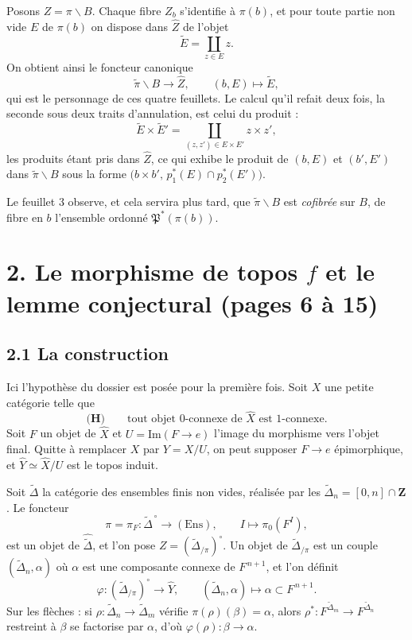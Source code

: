 \documentclass[11pt,a4paper]{article}
\begin{document}
Posons $Z = \pi\backslash B$. Chaque fibre $Z_{b}$ s'identifie à $\pi(b)$, et
pour toute partie non vide $E$ de $\pi(b)$ on dispose dans $\widehat{Z}$ de
l'objet
\[
  \widetilde{E} = \coprod_{z \in E} z .
\]
On obtient ainsi le foncteur canonique
\[
  \widetilde{\pi}\backslash B \longrightarrow \widehat{Z},
  \qquad (b,E) \longmapsto \widetilde{E},
\]
qui est le personnage de ces quatre feuillets. Le calcul qu'il refait deux
fois, la seconde sous deux traits d'annulation, est celui du produit :
\[
  \widetilde{E} \times \widetilde{E}'
  = \coprod_{(z,z') \in E \times E'} z \times z' ,
\]
les produits étant pris dans $\widehat{Z}$, ce qui exhibe le produit de
$(b,E)$ et $(b',E')$ dans $\widetilde{\pi}\backslash B$ sous la forme
$\bigl(b \times b',\, p_{1}^{*}(E) \cap p_{2}^{*}(E')\bigr)$.

Le feuillet 3 observe, et cela servira plus tard, que
$\widetilde{\pi}\backslash B$ est \emph{cofibrée} sur $B$, de fibre en $b$
l'ensemble ordonné $\mathfrak{P}^{*}(\pi(b))$.

\section*{2. Le morphisme de topos $f$ et le lemme conjectural (pages 6 à 15)}

\subsection*{2.1 La construction}

Ici l'hypothèse du dossier est posée pour la première fois. Soit $X$ une
petite catégorie telle que
\[
  \textbf{(H)} \qquad
  \text{tout objet } 0\text{-connexe de } \widehat{X} \text{ est } 1\text{-connexe.}
\]
Soit $F$ un objet de $\widehat{X}$ et $U = \mathrm{Im}(F \to e)$ l'image du
morphisme vers l'objet final. Quitte à remplacer $X$ par $Y = X/U$, on peut
supposer $F \to e$ épimorphique, et $\widehat{Y} \simeq \widehat{X}/U$ est le
topos induit.

Soit $\widetilde{\Delta}$ la catégorie des ensembles finis non vides, réalisée
par les $\widetilde{\Delta}_{n} = [0,n] \cap \mathbf{Z}$. Le foncteur
\[
  \pi = \pi_{F} : \widetilde{\Delta}^{\,\circ} \longrightarrow (\mathrm{Ens}),
  \qquad I \longmapsto \pi_{0}(F^{I}),
\]
est un objet de $\widehat{\widetilde{\Delta}}$, et l'on pose
$Z = (\widetilde{\Delta}_{/\pi})^{\circ}$. Un objet de
$\widetilde{\Delta}_{/\pi}$ est un couple $(\widetilde{\Delta}_{n}, \alpha)$
où $\alpha$ est une composante connexe de $F^{\,n+1}$, et l'on définit
\[
  \varphi : (\widetilde{\Delta}_{/\pi})^{\circ} \longrightarrow \widehat{Y},
  \qquad (\widetilde{\Delta}_{n}, \alpha) \longmapsto \alpha \subset F^{\,n+1}.
\]
Sur les flèches : si $\rho : \widetilde{\Delta}_{n} \to
\widetilde{\Delta}_{m}$ vérifie $\pi(\rho)(\beta) = \alpha$, alors
$\rho^{*} : F^{\widetilde{\Delta}_{m}} \to F^{\widetilde{\Delta}_{n}}$
restreint à $\beta$ se factorise par $\alpha$, d'où
$\varphi(\rho) : \beta \to \alpha$.
\end{document}
